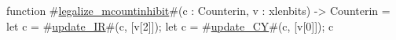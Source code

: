 function #\hyperref[sailRISCVzlegalizzezymcountinhibit]{legalize\_mcountinhibit}#(c : Counterin, v : xlenbits) -> Counterin = {
  let c = #\hyperref[sailRISCVzupdatezyIR]{update\_IR}#(c, [v[2]]);
  let c = #\hyperref[sailRISCVzupdatezyCY]{update\_CY}#(c, [v[0]]);
  c
}
